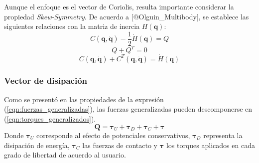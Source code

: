     Aunque el enfoque es el vector de Coriolis, resulta importante considerar la propiedad \emph{Skew-Symmetry}. De acuerdo a [@Olguin_Multibody],
    se establece las siguientes relaciones con la matriz de inercia $H(\boldsymbol{q})$:
    \begin{equation}
        \label{eqn:skew1}
        C(\boldsymbol{q}, \boldsymbol{\dot{q}}) - \frac{1}{2}\dot{H}(\boldsymbol{q}) = Q 
    \end{equation}
    \begin{equation}
        \label{eqn:skew2}
        Q + Q^T = 0
    \end{equation}
    \begin{equation}
        \label{eqn:skew3}
        C(\boldsymbol{q}, \boldsymbol{\dot{q}}) + C^T(\boldsymbol{q}, \boldsymbol{\dot{q}}) = \dot{H}(\boldsymbol{q})
    \end{equation}

    \subsubsection{Vector de disipación}
    Como se presentó en las propiedades de la expresión (\ref{eqn:fuerzas_generalizadas}), las fuerzas generalizadas pueden descomponerse en (\ref{eqn:torques_generalizados}).
    \begin{equation}
        \label{eqn:torques_generalizados}
         \boldsymbol{Q} = \boldsymbol{\tau}_U + \boldsymbol{\tau}_D + \boldsymbol{\tau}_C + \boldsymbol{\tau}
    \end{equation}
    Donde $\boldsymbol{\tau}_U$ corresponde al efecto de potenciales conservativos, $\boldsymbol{\tau}_D$ representa la disipación de energía, $\boldsymbol{\tau}_C$
    las fuerzas de contacto y $\boldsymbol{\tau}$ los torques aplicados en cada grado de libertad de acuerdo al usuario. 
    
